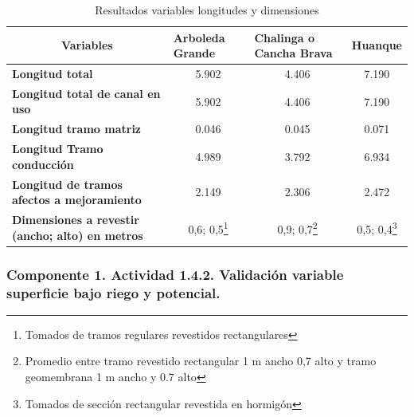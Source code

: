 \documentclass[]{article}
\let\rmarkdownfootnote\footnote%
\def\footnote{\protect\rmarkdownfootnote}
\begin{document}
\begin{longtable}{|l|ccc|}
\caption{Resultados variables longitudes y dimensiones}\\
\hline
\multicolumn{1}{|c|}{\textbf{Variables}}                 & \multicolumn{1}{l}{\textbf{Arboleda Grande}} & \multicolumn{1}{l}{\textbf{Chalinga o Cancha Brava}} & \multicolumn{1}{l|}{\textbf{Huanque}} \\ \hline
\textbf{Longitud total}                                  & 5.902                                        & 4.406                                                & 7.190                                 \\
\textbf{Longitud total de canal en uso}                  & 5.902                                        & 4.406                                                & 7.190                                 \\
\textbf{Longitud tramo matriz}                           & 0.046                                        & 0.045                                                & 0.071                                 \\
\textbf{Longitud Tramo conducción}                       & 4.989                                        & 3.792                                                & 6.934                                 \\
\textbf{Longitud de tramos afectos a mejoramiento}       & 2.149                                        & 2.306                                                & 2.472                                 \\
\textbf{Dimensiones a revestir  (ancho; alto) en metros} & 0,6; 0,5\footnote{Tomados de tramos regulares revestidos rectangulares}                                    & 0,9; 0,7\footnote{Promedio entre tramo revestido rectangular 1 m ancho 0,7 alto y tramo geomembrana 1 m ancho y 0.7 alto}                                          & 0,5; 0,4\footnote{Tomados de sección rectangular revestida en hormigón }                           \\ 
\hline
\end{longtable}%





\subsubsection{Componente 1. Actividad 1.4.2. Validación variable superficie bajo riego y potencial.}
\end{document}
